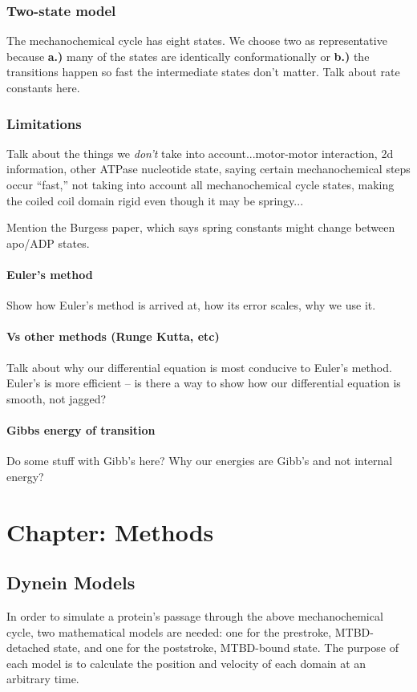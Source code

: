\documentclass[10pt]{article} %
\begin{document}
\subsubsection{Two-state model}
The mechanochemical cycle has eight states. We choose two as representative because \textbf{a.)}
many of the states are identically conformationally or \textbf{b.)} the transitions happen so fast
the intermediate states don't matter. Talk about rate constants here.
\subsubsection{Limitations}
Talk about the things we \textit{don't} take into account...motor-motor interaction, 2d information,
other ATPase nucleotide state, saying certain mechanochemical steps occur ``fast,'' not taking into
account all mechanochemical cycle states, making the coiled coil domain rigid even though it may be
springy...

Mention the Burgess paper, which says spring constants might change between apo/ADP states.

\paragraph{Euler’s method}
Show how Euler's method is arrived at, how its error scales, why we use it.

\paragraph{Vs other methods (Runge Kutta, etc)}
Talk about why our differential equation is most conducive to Euler's method. Euler's is more
efficient -- is there a way to show how our differential equation is smooth, not jagged?

\paragraph{Gibbs energy of transition}
Do some stuff with Gibb's here? Why our energies are Gibb's and not internal energy?\\

\section{Chapter: Methods}

\subsection{Dynein Models}
In order to simulate a protein's passage through the above mechanochemical cycle, two mathematical models are needed: one for the prestroke, MTBD-detached state, and one for the poststroke, MTBD-bound state. The purpose of each model is to calculate the position and velocity of each domain at an arbitrary time.\\
\end{document}
